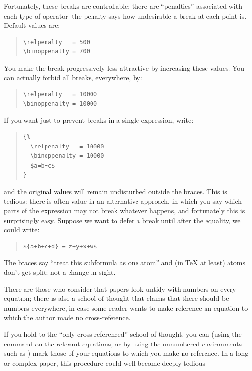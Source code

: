 Fortunately, these breaks are controllable: there are ``penalties''
associated with each type of operator: the penalty 
 says how
undesirable a break at each point is.  Default values are:
\begin{quote}
\begin{verbatim}
\relpenalty   = 500
\binoppenalty = 700
\end{verbatim}
\end{quote}
You make the break progressively less attractive by increasing these
values.  You can actually forbid all breaks, everywhere, by:
\begin{quote}
\begin{verbatim}
\relpenalty   = 10000
\binoppenalty = 10000
\end{verbatim}
\end{quote}
If you want just to prevent breaks in a single expression, write:
\begin{quote}
\begin{verbatim}
{%
  \relpenalty   = 10000
  \binoppenalty = 10000
  $a=b+c$
}
\end{verbatim}
\end{quote}
and the original values will remain undisturbed outside the braces.
This is tedious: there is often value in an alternative approach,
in which you say which parts of the expression may not break whatever
happens, and fortunately this is surprisingly easy.  Suppose we want
to defer a break until after the equality, we could write:
\begin{quote}
\begin{verbatim}
${a+b+c+d} = z+y+x+w$
\end{verbatim}
\end{quote}
The braces say ``treat this subformula as one atom'' and (in \TeX{} at
least) atoms don't get split: not a  change in sight.


There are those who consider that papers look untidy with numbers on
every equation; there is also a school of thought that claims that
there should be numbers everywhere, in case some reader wants to make
reference an equation to which the author made no cross-reference.

If you hold to the ``only cross-referenced'' school of thought, you
can (using the  command on the relevant equations, or by
using the \AMSLaTeX{} unnumbered environments such as
) mark those of your equations to which you
make no reference.  In a long or complex paper, this procedure could
well become deeply tedious.


